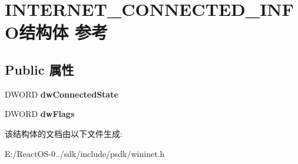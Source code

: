 \hypertarget{struct_i_n_t_e_r_n_e_t___c_o_n_n_e_c_t_e_d___i_n_f_o}{}\section{I\+N\+T\+E\+R\+N\+E\+T\+\_\+\+C\+O\+N\+N\+E\+C\+T\+E\+D\+\_\+\+I\+N\+F\+O结构体 参考}
\label{struct_i_n_t_e_r_n_e_t___c_o_n_n_e_c_t_e_d___i_n_f_o}
\subsection*{Public 属性}
\begin{DoxyCompactItemize}
\item 
\mbox{\label{struct_i_n_t_e_r_n_e_t___c_o_n_n_e_c_t_e_d___i_n_f_o_abd3bd903b90f12a9bde7ad5ee4a123f2}} 
D\+W\+O\+RD {\bfseries dw\+Connected\+State}
\item 
\mbox{\label{struct_i_n_t_e_r_n_e_t___c_o_n_n_e_c_t_e_d___i_n_f_o_ac28bc5163b7b724075a83cd798fbccfb}} 
D\+W\+O\+RD {\bfseries dw\+Flags}
\end{DoxyCompactItemize}


该结构体的文档由以下文件生成\+:\begin{DoxyCompactItemize}
\item 
E\+:/\+React\+O\+S-\/0../sdk/include/psdk/wininet.\+h\end{DoxyCompactItemize}
